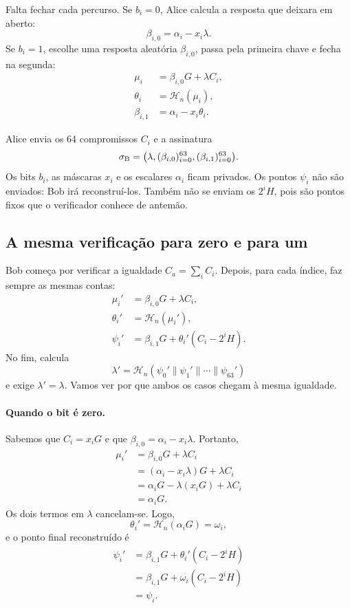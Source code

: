 Falta fechar cada percurso. Se \(b_i=0\), Alice calcula a resposta que
deixara em aberto:
\[
 \beta_{i,0}=\alpha_i-x_i\lambda.
\]
Se \(b_i=1\), escolhe uma resposta aleatória \(\beta_{i,0}\), passa pela
primeira chave e fecha na segunda:
\begin{align*}
 \mu_i&=\beta_{i,0}G+\lambda C_i,\\
 \theta_i&=\mathcal H_n(\mu_i),\\
 \beta_{i,1}&=\alpha_i-x_i\theta_i.
\end{align*}

Alice envia os 64 compromissos \(C_i\) e a assinatura
\[
 \sigma_{\rm B}=
 \bigl(\lambda,(\beta_{i,0})_{i=0}^{63},
                 (\beta_{i,1})_{i=0}^{63}\bigr).
\]
Os bits \(b_i\), as máscaras \(x_i\) e os escalares \(\alpha_i\) ficam
privados. Os pontos \(\psi_i\) não são enviados: Bob irá reconstruí-los.
Também não se enviam os \(2^iH\), pois são pontos fixos que o verificador
conhece de antemão.

\subsection{A mesma verificação para zero e para um}

Bob começa por verificar a igualdade \(C_a=\sum_iC_i\). Depois, para cada
índice, faz sempre as mesmas contas:
\begin{align*}
 \mu_i'&=\beta_{i,0}G+\lambda C_i,\\
 \theta_i'&=\mathcal H_n(\mu_i'),\\
 \psi_i'&=\beta_{i,1}G+\theta_i'(C_i-2^iH).
\end{align*}
No fim, calcula
\[
 \lambda'=\mathcal H_n(\psi_0'\mathbin\|\psi_1'\mathbin\|\cdots
                          \mathbin\|\psi_{63}')
\]
e exige \(\lambda'=\lambda\). Vamos ver por que ambos os casos chegam à
mesma igualdade.

\paragraph{Quando o bit é zero.}
Sabemos que \(C_i=x_iG\) e que
\(\beta_{i,0}=\alpha_i-x_i\lambda\). Portanto,
\begin{align*}
 \mu_i'
   &=\beta_{i,0}G+\lambda C_i\\
   &=(\alpha_i-x_i\lambda)G+\lambda C_i\\
   &=\alpha_iG-\lambda(x_iG)+\lambda C_i\\
   &=\alpha_iG.
\end{align*}
Os dois termos em \(\lambda\) cancelam-se. Logo,
\[
 \theta_i'=\mathcal H_n(\alpha_iG)=\omega_i,
\]
e o ponto final reconstruído é
\begin{align*}
 \psi_i'
   &=\beta_{i,1}G+\theta_i'(C_i-2^iH)\\
   &=\beta_{i,1}G+\omega_i(C_i-2^iH)\\
   &=\psi_i.
\end{align*}

